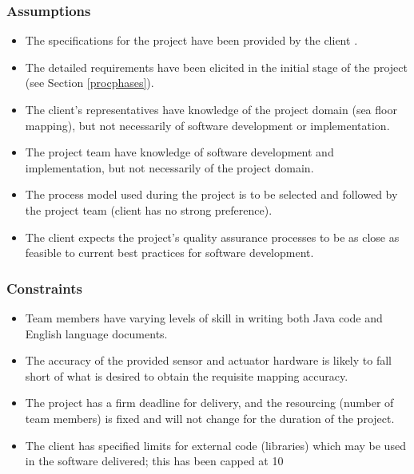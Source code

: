 \documentclass[12pt]{article}
\begin{document}
\subsubsection{Assumptions}
\begin{itemize}{}
\item The specifications for the project have been provided by the client \cite{spec}.
\item The detailed requirements have been elicited in the initial stage of the project (see Section \ref{procphases}).
\item The client's representatives have knowledge of the project domain (sea floor mapping), but not necessarily of software development or implementation.
\item The project team have knowledge of software development and implementation, but not necessarily of the project domain.
\item The process model used during the project is to be selected and followed by the project team (client has no strong preference).
\item The client expects the project's quality assurance processes to be as close as feasible to current best practices for software development.
\end{itemize}

\subsubsection{Constraints}
\begin{itemize}{}
\item Team members have varying levels of skill in writing both Java code and English language documents. 
\item The accuracy of the provided sensor and actuator hardware is likely to fall short of what is desired to obtain the requisite mapping accuracy.
\item The project has a firm deadline for delivery, and the resourcing (number of team members) is fixed and will not change for the duration of the project.
\item The client has specified limits for external code (libraries) which may be used in the software delivered; this has been capped at 10%
\end{itemize}
\end{document}
